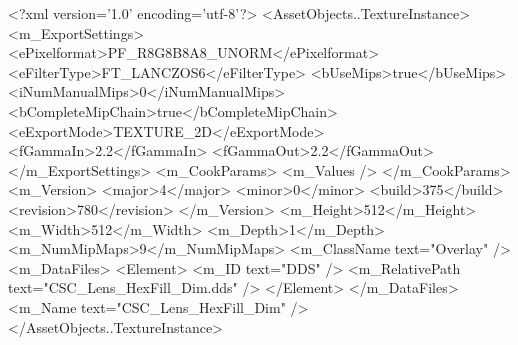 <?xml version='1.0' encoding='utf-8'?>
<AssetObjects..TextureInstance>
  <m_ExportSettings>
    <ePixelformat>PF_R8G8B8A8_UNORM</ePixelformat>
    <eFilterType>FT_LANCZOS6</eFilterType>
    <bUseMips>true</bUseMips>
    <iNumManualMips>0</iNumManualMips>
    <bCompleteMipChain>true</bCompleteMipChain>
    <eExportMode>TEXTURE_2D</eExportMode>
    <fGammaIn>2.2</fGammaIn>
    <fGammaOut>2.2</fGammaOut>
  </m_ExportSettings>
  <m_CookParams>
    <m_Values />
  </m_CookParams>
  <m_Version>
    <major>4</major>
    <minor>0</minor>
    <build>375</build>
    <revision>780</revision>
  </m_Version>
  <m_Height>512</m_Height>
  <m_Width>512</m_Width>
  <m_Depth>1</m_Depth>
  <m_NumMipMaps>9</m_NumMipMaps>
  <m_ClassName text="Overlay" />
  <m_DataFiles>
    <Element>
      <m_ID text="DDS" />
      <m_RelativePath text="CSC_Lens_HexFill_Dim.dds" />
    </Element>
  </m_DataFiles>
  <m_Name text="CSC_Lens_HexFill_Dim" />
</AssetObjects..TextureInstance>
